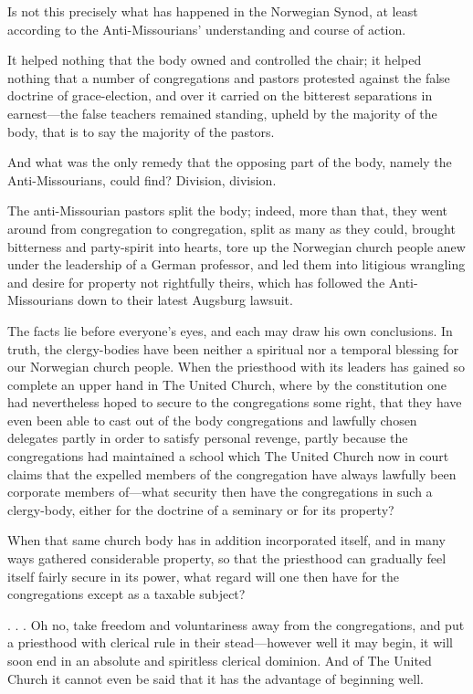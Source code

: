 Is not this precisely what has happened in the Norwegian Synod, at least according to the Anti-Missourians’ understanding and course of action.

It helped nothing that the body owned and controlled the chair; it helped nothing that a number of congregations and pastors protested against the false doctrine of grace-election, and over it carried on the bitterest separations in earnest—the false teachers remained standing, upheld by the majority of the body, that is to say the majority of the pastors.

And what was the only remedy that the opposing part of the body, namely the Anti-Missourians, could find? Division, division.

The anti-Missourian pastors split the body; indeed, more than that, they went around from congregation to congregation, split as many as they could, brought bitterness and party-spirit into hearts, tore up the Norwegian church people anew under the leadership of a German professor, and led them into litigious wrangling and desire for property not rightfully theirs, which has followed the Anti-Missourians down to their latest Augsburg lawsuit.

The facts lie before everyone’s eyes, and each may draw his own conclusions. In truth, the clergy-bodies have been neither a spiritual nor a temporal blessing for our Norwegian church people. When the priesthood with its leaders has gained so complete an upper hand in The United Church, where by the constitution one had nevertheless hoped to secure to the congregations some right, that they have even been able to cast out of the body congregations and lawfully chosen delegates partly in order to satisfy personal revenge, partly because the congregations had maintained a school which The United Church now in court claims that the expelled members of the congregation have always lawfully been corporate members of—what security then have the congregations in such a clergy-body, either for the doctrine of a seminary or for its property?

When that same church body has in addition incorporated itself, and in many ways gathered considerable property, so that the priesthood can gradually feel itself fairly secure in its power, what regard will one then have for the congregations except as a taxable subject?

. . . Oh no, take freedom and voluntariness away from the congregations, and put a priesthood with clerical rule in their stead—however well it may begin, it will soon end in an absolute and spiritless clerical dominion. And of The United Church it cannot even be said that it has the advantage of beginning well.

